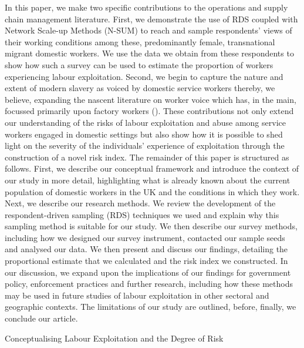 \documentclass[
  12pt,
  letterpaper,
  DIV=11,
  numbers=noendperiod]{scrartcl}
\theoremstyle{plain}
\theoremstyle{definition}
\begin{document}
In this paper, we make two specific contributions to the operations and
supply chain management literature. First, we demonstrate the use of RDS
coupled with Network Scale-up Methods (N-SUM) to reach and sample
respondents' views of their working conditions among these,
predominantly female, transnational migrant domestic workers. We use the
data we obtain from these respondents to show how such a survey can be
used to estimate the proportion of workers experiencing labour
exploitation. Second, we begin to capture the nature and extent of
modern slavery as voiced by domestic service workers thereby, we
believe, expanding the nascent literature on worker voice which has, in
the main, focussed primarily upon factory workers
(\textcite{stephens_theorising_2024}). These contributions not only
extend our understanding of the risks of labour exploitation and abuse
among service workers engaged in domestic settings but also show how it
is possible to shed light on the severity of the individuals' experience
of exploitation through the construction of a novel risk index. The
remainder of this paper is structured as follows. First, we describe our
conceptual framework and introduce the context of our study in more
detail, highlighting what is already known about the current population
of domestic workers in the UK and the conditions in which they work.
Next, we describe our research methods. We review the development of the
respondent-driven sampling (RDS) techniques we used and explain why this
sampling method is suitable for our study. We then describe our survey
methods, including how we designed our survey instrument, contacted our
sample seeds and analysed our data. We then present and discuss our
findings, detailing the proportional estimate that we calculated and the
risk index we constructed. In our discussion, we expand upon the
implications of our findings for government policy, enforcement
practices and further research, including how these methods may be used
in future studies of labour exploitation in other sectoral and
geographic contexts. The limitations of our study are outlined, before,
finally, we conclude our article.

Conceptualising Labour Exploitation and the Degree of Risk
\end{document}
